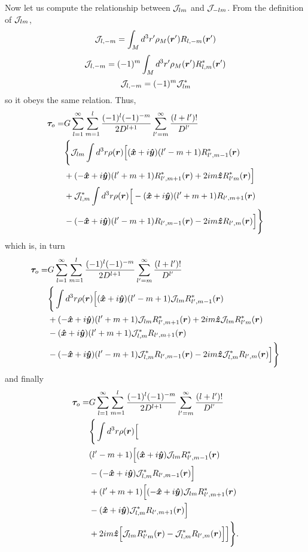 \documentclass[aps,twocolumn,secnumarabic,balancelastpage,amsmath,amssymb,nofootinbib,floatfix]{revtex4-1}
\begin{document}
Now let us compute the relationship between $\mathcal{J}_{lm}$ and $\mathcal{J}_{-lm}$. From the definition of $\mathcal{J}_{lm}$,
$$\mathcal{J}_{l,-m} = \int_M d^3 r' \rho_M(\bm r')R_{l,-m}(\bm r')$$
$$\mathcal{J}_{l,-m} = (-1)^m\int_M d^3 r' \rho_M(\bm r')R^*_{l,m}(\bm r')$$
$$\mathcal{J}_{l,-m} = (-1)^m\mathcal{J}_{lm}^*$$
so it obeys the same relation. Thus,
\begin{equation*}
\begin{aligned}
\bm \tau_o = &G\sum_{l=1}^\infty \sum_{m=1}^l \frac{(-1)^l(-1)^{-m}}{2D^{l+1}}\sum_{l'=m}^\infty \frac{(l+l')!}{D^{l'}}\\
&\Bigg\{\mathcal{J}_{lm} \int d^3 r\rho(\bm r)\Big[(\bm{\hat x} + i\bm{\hat y})(l'-m+1)R^*_{l',m-1}(\bm r)\\
&+(-\bm{\hat x}+i\bm{\hat y})(l'+m+1)R^*_{l',m+1}(\bm r)+2im\bm{\hat z} R^*_{l'm}(\bm r)\Big] \\
&+ \mathcal{J}_{l,m}^* \int d^3 r\rho(\bm r)\Big[-(\bm{\hat x} + i\bm{\hat y})(l'+m+1)R_{l',m+1}(\bm r)\\
&-(-\bm{\hat x}+i\bm{\hat y})(l'-m+1)R_{l',m-1}(\bm r)-2im\bm{\hat z} R_{l',m}(\bm r)\Big]\Bigg\}
\end{aligned}
\end{equation*}
which is, in turn
\begin{equation*}
\begin{aligned}
\bm \tau_o = &G\sum_{l=1}^\infty \sum_{m=1}^l \frac{(-1)^l(-1)^{-m}}{2D^{l+1}}\sum_{l'=m}^\infty \frac{(l+l')!}{D^{l'}}\\
&\Bigg\{\int d^3 r\rho(\bm r)\Big[(\bm{\hat x} + i\bm{\hat y})(l'-m+1)\mathcal{J}_{lm} R^*_{l',m-1}(\bm r)\\
&+(-\bm{\hat x}+i\bm{\hat y})(l'+m+1)\mathcal{J}_{lm} R^*_{l',m+1}(\bm r)+2im\bm{\hat z} \mathcal{J}_{lm} R^*_{l'm}(\bm r) \\
&-(\bm{\hat x} + i\bm{\hat y})(l'+m+1)\mathcal{J}_{l,m}^* R_{l',m+1}(\bm r)\\
&-(-\bm{\hat x}+i\bm{\hat y})(l'-m+1)\mathcal{J}_{l,m}^* R_{l',m-1}(\bm r)-2im\bm{\hat z} \mathcal{J}_{l,m}^* R_{l',m}(\bm r)\Big]\Bigg\}
\end{aligned}
\end{equation*}
and finally
\begin{equation*}
\begin{aligned}
\bm \tau_o = &G\sum_{l=1}^\infty \sum_{m=1}^l \frac{(-1)^l(-1)^{-m}}{2D^{l+1}}\sum_{l'=m}^\infty \frac{(l+l')!}{D^{l'}}\\
&\Bigg\{\int d^3 r\rho(\bm r)\Big[\\
&(l'-m+1)\Big[(\bm{\hat x} + i\bm{\hat y})\mathcal{J}_{lm} R^*_{l',m-1}(\bm r)\\
&-(-\bm{\hat x}+i\bm{\hat y})\mathcal{J}_{l,m}^* R_{l',m-1}(\bm r)\Big]\\
&+(l'+m+1)\Big[(-\bm{\hat x}+i\bm{\hat y})\mathcal{J}_{lm} R^*_{l',m+1}(\bm r)\\
&- (\bm{\hat x} + i\bm{\hat y})\mathcal{J}_{l,m}^* R_{l',m+1}(\bm r)\Big]\\
&+2im\bm{\hat z}\Big[\mathcal{J}_{lm} R^*_{l'm}(\bm r)-\mathcal{J}_{l,m}^* R_{l',m}(\bm r)\Big]\Big]\Bigg\}.
\end{aligned}
\end{equation*}
\end{document}
